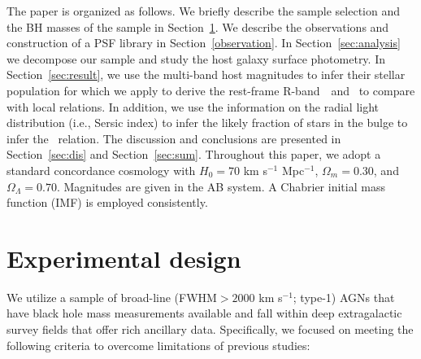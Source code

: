 \documentclass[apj]{emulateapj}
\begin{document}
The paper is organized as follows. We briefly describe the sample selection and the BH masses of the sample in Section~\ref{sec:data}. We describe the observations and construction of a PSF library in Section~\ref{observation}. In Section~\ref{sec:analysis} we decompose our sample and study the host galaxy surface photometry. In Section~\ref{sec:result}, we use the multi-band host magnitudes to infer their stellar population for which we apply to derive the rest-frame R-band \lhost\,~and \smass\ to compare with local relations. In addition, we use the information on the radial light distribution (i.e., Sersic index) to infer the likely fraction of stars in the bulge to infer the \bmass\ relation. The discussion and conclusions are presented in Section~\ref{sec:dis} and Section~\ref{sec:sum}. Throughout this paper, we adopt a standard concordance cosmology with $H_0= 70$ km s$^{-1}$ Mpc$^{-1}$, $\Omega{_m} = 0.30$, and $\Omega{_\Lambda} = 0.70$. Magnitudes are given in the AB system. A Chabrier initial mass function (IMF) is employed consistently.


\section{Experimental design}
\label{sec:data}

We utilize a sample of broad-line (FWHM$>2000$ km s$^{-1}$; type-1) AGNs that have black hole mass measurements available and fall within deep extragalactic survey fields that offer rich ancillary data. Specifically, we focused on meeting the following criteria to overcome limitations of previous studies:
\end{document}
